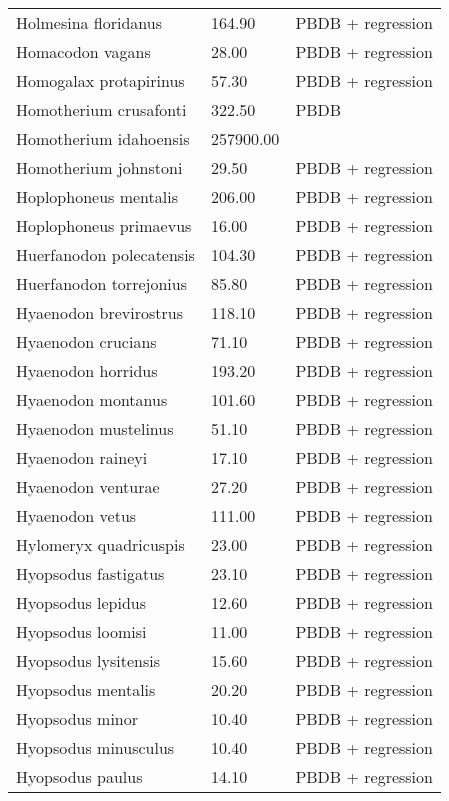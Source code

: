 \documentclass{article}
\begin{document}
\begin{center}
\begin{longtable}{p{} p{} p{}}
    Holmesina floridanus & 164.90 & PBDB + regression \\ 
    Homacodon vagans & 28.00 & PBDB + regression \\ 
    Homogalax protapirinus & 57.30 & PBDB + regression \\ 
    Homotherium crusafonti & 322.50 & PBDB \\ 
    Homotherium idahoensis & 257900.00 & \cite{McKenna2011} \\ 
    Homotherium johnstoni & 29.50 & PBDB + regression \\ 
    Hoplophoneus mentalis & 206.00 & PBDB + regression \\ 
    Hoplophoneus primaevus & 16.00 & PBDB + regression \\ 
    Huerfanodon polecatensis & 104.30 & PBDB + regression \\ 
    Huerfanodon torrejonius & 85.80 & PBDB + regression \\ 
    Hyaenodon brevirostrus & 118.10 & PBDB + regression \\ 
    Hyaenodon crucians & 71.10 & PBDB + regression \\ 
    Hyaenodon horridus & 193.20 & PBDB + regression \\ 
    Hyaenodon montanus & 101.60 & PBDB + regression \\ 
    Hyaenodon mustelinus & 51.10 & PBDB + regression \\ 
    Hyaenodon raineyi & 17.10 & PBDB + regression \\ 
    Hyaenodon venturae & 27.20 & PBDB + regression \\ 
    Hyaenodon vetus & 111.00 & PBDB + regression \\ 
    Hylomeryx quadricuspis & 23.00 & PBDB + regression \\ 
    Hyopsodus fastigatus & 23.10 & PBDB + regression \\ 
    Hyopsodus lepidus & 12.60 & PBDB + regression \\ 
    Hyopsodus loomisi & 11.00 & PBDB + regression \\ 
    Hyopsodus lysitensis & 15.60 & PBDB + regression \\ 
    Hyopsodus mentalis & 20.20 & PBDB + regression \\ 
    Hyopsodus minor & 10.40 & PBDB + regression \\ 
    Hyopsodus minusculus & 10.40 & PBDB + regression \\ 
    Hyopsodus paulus & 14.10 & PBDB + regression \\ 

\end{longtable}
\end{center}
\end{document}
